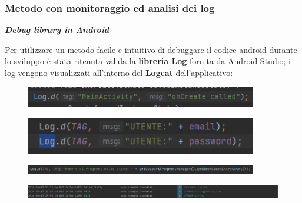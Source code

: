 \documentclass{article}
\begin{document}
		\subsubsection{Metodo con monitoraggio ed analisi dei log}
		\begin{center}
			\textbf{\textit{\textcolor{dark_purple}{Debug library in Android}}}\\
		\end{center}
		Per utilizzare un metodo facile e intuitivo di debuggare il codice android durante lo sviluppo è stata ritenuta valida la \textbf{libreria Log} fornita da Android Studio; i log vengono visualizzati all’interno del \textbf{Logcat} dell’applicativo:
		\begin{center}
			\begin{figure}[H]
				\centering
				\includegraphics[width=0.9\textwidth]{Immagini/log}
			\end{figure}
			
			\begin{figure}[H]
				\centering
				\includegraphics[width=0.9\textwidth]{Immagini/log1}
			\end{figure}
			
			\begin{figure}[H]
				\centering
				\includegraphics[width=0.9\textwidth]{Immagini/log2}
			\end{figure}
			
			\begin{figure}[H]
				\centering
				\includegraphics[width=1.0\textwidth]{Immagini/logcat}
			\end{figure}
		\end{center}
\end{document}
